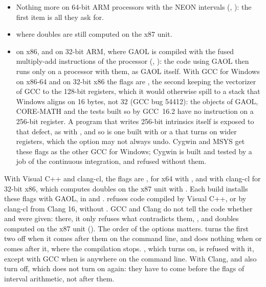 \documentclass[12pt,a4paper,twoside,openright]{book}
\begin{document}
\begin{itemize}
  continuous integration.
\item Nothing more on 64-bit ARM processors with the NEON intervals
  (, ): the first item is all they ask
  for.\newinvfive
\item {} where doubles are still computed on the x87 unit.
\item {} on x86, and  on
  32-bit ARM, where GAOL is compiled with the fused multiply-add instructions
  of the processor (, ): the code
  using GAOL then runs only on a processor with them, as GAOL itself. With GCC
  for Windows on x86-64 and on 32-bit x86 the flags are , the second keeping the vectorizer of GCC to the
  128-bit registers, which it would otherwise spill to a stack that Windows
  aligns on 16 bytes, not 32 (GCC bug 54412): the objects of GAOL, CORE-MATH
  and the tests built so by GCC~16.2 have no instruction on a 256-bit
  register. A program that writes 256-bit intrinsics itself is exposed to that
  defect, as with , and so is one built with
   or a  that turns on wider registers, which
  the option may not always undo. Cygwin and MSYS get these flags as the other
  GCC for Windows; Cygwin is built and tested by a job of the continuous
  integration, and refused without them.\newinvfive
\end{itemize}

\noindent
With Visual C++ and clang-cl, the flags are ,
 for x64 with , and  with
clang-cl for 32-bit x86, which computes doubles on the x87 unit with
. Each build installs these flags with GAOL, in
 and .  refuses code
compiled by Visual C++, or by clang-cl from Clang 16, without
. GCC and Clang do not tell the code whether
 and  were given: there, it
only refuses what contradicts them, ,
 and doubles computed on the x87 unit
(). The order of the options matters.
 turns the first two off when it comes after them on
the command line, and does nothing when  or
 comes after it, where the compilation stops.
, which turns  on, is refused with it,
except with GCC when  is anywhere on the command line.
With Clang,  and  also turn
 off, which  does not turn on
again: they have to come before the flags of interval arithmetic, not after
them.
\end{document}
